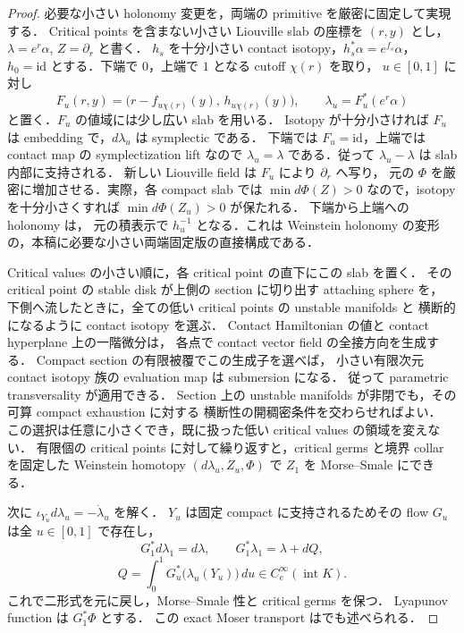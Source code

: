 \begin{proof}
必要な小さい holonomy 変更を，両端の primitive を厳密に固定して実現する．
Critical points を含まない小さい Liouville slab の座標を $(r,y)$ とし，
$\lambda=e^r\alpha$, $Z=\partial_r$ と書く．
$h_s$ を十分小さい contact isotopy，$h_s^*\alpha=e^{f_s}\alpha$，
$h_0=\mathrm{id}$ とする．下端で $0$，上端で $1$ となる cutoff $\chi(r)$ を取り，
$u\in[0,1]$ に対し
\[
 F_u(r,y)=\bigl(r-f_{u\chi(r)}(y),\,h_{u\chi(r)}(y)\bigr),
 \qquad \lambda_u=F_u^*(e^r\alpha)
\]
と置く．$F_u$ の値域には少し広い slab を用いる．
Isotopy が十分小さければ $F_u$ は embedding で，$d\lambda_u$ は symplectic である．
下端では $F_u=\mathrm{id}$，上端では contact map の symplectization lift
なので $\lambda_u=\lambda$ である．従って $\lambda_u-\lambda$ は slab 内部に支持される．
新しい Liouville field は $F_u$ により $\partial_r$ へ写り，
元の $\Phi$ を厳密に増加させる．実際，各 compact slab では
$\min d\Phi(Z)>0$ なので，isotopy を十分小さくすれば $\min d\Phi(Z_u)>0$ が保たれる．
下端から上端への holonomy は，
元の積表示で $h_u^{-1}$ となる．これは Weinstein holonomy の変形
\cite[\S4A, Lemma~4.1]{CEFlexible}の，本稿に必要な小さい両端固定版の直接構成である．

Critical values の小さい順に，各 critical point の直下にこの slab を置く．
その critical point の stable disk が上側の section に切り出す attaching sphere を，
下側へ流したときに，全ての低い critical points の unstable manifolds と
横断的になるように contact isotopy を選ぶ．
Contact Hamiltonian の値と contact hyperplane 上の一階微分は，
各点で contact vector field の全接方向を生成する．
Compact section の有限被覆でこの生成子を選べば，
小さい有限次元 contact isotopy 族の evaluation map は submersion になる．
従って parametric transversality が適用できる．
Section 上の unstable manifolds が非閉でも，その可算 compact exhaustion に対する
横断性の開稠密条件を交わらせればよい．
この選択は任意に小さくでき，既に扱った低い critical values の領域を変えない．
有限個の critical points に対して繰り返すと，critical germs と境界 collar を固定した
Weinstein homotopy $(d\lambda_u,Z_u,\Phi)$ で $Z_1$ を Morse--Smale にできる．

次に $\iota_{Y_u}d\lambda_u=-\dot\lambda_u$ を解く．
$Y_u$ は固定 compact に支持されるためその flow $G_u$ は全 $u\in[0,1]$ で存在し，
\[
 G_1^*d\lambda_1=d\lambda,\qquad
 G_1^*\lambda_1=\lambda+dQ,
\]
\[
 Q=\int_0^1G_u^*\bigl(\lambda_u(Y_u)\bigr)\,du
 \in C_c^\infty(\operatorname{int}K).
\]
これで二形式を元に戻し，Morse--Smale 性と critical germs を保つ．
Lyapunov function は $G_1^*\Phi$ とする．
この exact Moser transport は\cite[\S1]{EliashbergWeinsteinRevisited}でも述べられる．


\end{proof}
